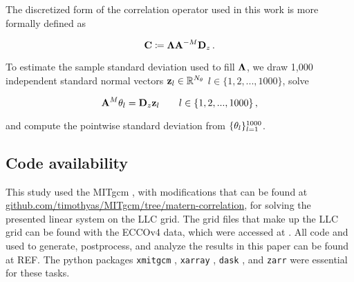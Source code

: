 The discretized form of the correlation operator used in this work is more
formally defined as
\begin{linenomath*}\begin{equation}
    \mathbf{C} \coloneqq \bm{\Lambda} \mathbf{A}^{-M} \mathbf{D}_z \, .
    \label{eq:corr_operator_fv}
\end{equation}\end{linenomath*}
To estimate the sample standard deviation used to fill $\bm{\Lambda}$, we
draw 1,000 independent standard normal vectors $\mathbf{z}_{l} \in \mathbb{R}^{N_{\theta}}$
$l\in \{1, 2, ..., 1000\}$, solve
\begin{linenomath*}\begin{equation}
    \mathbf{A}^{M} \mathbf{\theta}_{l} = \mathbf{D}_z \mathbf{z}_{l}
        \qquad l \in \{1, 2, ..., 1000\} \, ,
    \label{eq:sampling}
\end{equation}\end{linenomath*}
and compute the pointwise standard deviation from $\{\mathbf{\theta}_{l}\}_{l=1}^{1000}$.

\subsection{Code availability}
\label{ssec:the_code}

This study used the MITgcm \citep{campin_mitgcmmitgcm_2021}, with modifications
that can be found at \url{github.com/timothyas/MITgcm/tree/matern-correlation}, for solving the
presented linear system on the LLC grid.
The grid files that make up the LLC grid can be found with the ECCOv4 data,
which were accessed at \citep{ecco_v4r2}.
All code and used to generate, postprocess, and analyze the results in this paper
can be found at REF.
The python packages \texttt{xmitgcm} \citep{abernathey_2021_5139886},
\texttt{xarray} \citep{hoyer2017xarray}, \texttt{dask} \citep{dask}, and
\texttt{zarr} \citep{alistair_miles_2020_3773450}
were essential for these tasks.
